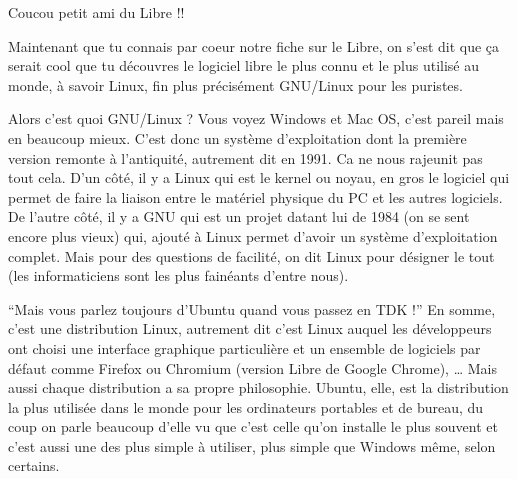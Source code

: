 \documentclass[12pt]{../fiche}
\begin{document}

Coucou petit ami du Libre !!
\vspace{0.8em}

Maintenant que tu connais par coeur notre fiche sur le Libre, on s’est dit que ça serait cool que tu découvres le logiciel libre le plus connu et le plus utilisé au monde, à savoir Linux, fin plus précisément GNU/Linux pour les puristes.
\vspace{0.8em}

Alors c’est quoi GNU/Linux ? Vous voyez Windows et Mac OS, c’est pareil mais en beaucoup mieux. C’est donc un système d'exploitation dont la première version remonte à l’antiquité, autrement dit en 1991. Ca ne nous rajeunit pas tout cela. D’un côté, il y a Linux qui est le kernel ou noyau, en gros le logiciel qui permet de faire la liaison entre le matériel physique du PC et les autres logiciels. De l’autre côté, il y a GNU qui est un projet datant lui de 1984 (on se sent encore plus vieux) qui, ajouté à Linux permet d’avoir un système d'exploitation complet. Mais pour des questions de facilité, on dit Linux pour désigner le tout (les informaticiens sont les plus fainéants d’entre nous).
\vspace{0.8em}

“Mais vous parlez toujours d’Ubuntu quand vous passez en TDK !” En somme, c’est une distribution Linux, autrement dit c’est Linux auquel les développeurs ont choisi une interface graphique particulière et un ensemble de logiciels par défaut comme Firefox ou Chromium (version Libre de Google Chrome), … Mais aussi chaque distribution a sa propre philosophie. Ubuntu, elle, est la distribution la plus utilisée dans le monde pour les ordinateurs portables et de bureau, du coup on parle beaucoup d’elle vu que c’est celle qu’on installe le plus souvent et c’est aussi une des plus simple à utiliser, plus simple que Windows même, selon certains.
\vspace{0.8em}
\end{document}

